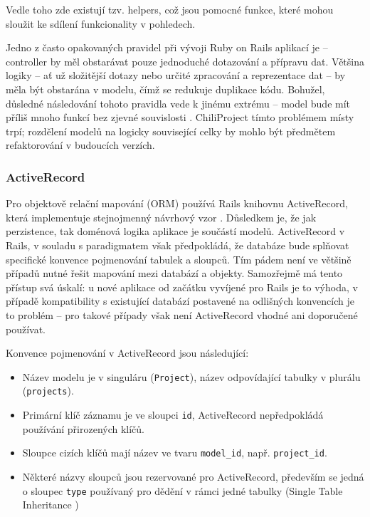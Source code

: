 \documentclass[thesis=B,czech]{FITthesis}[2012/05/02]
\begin{document}
Vedle toho zde existují tzv. helpers, což jsou pomocné funkce, které
mohou sloužit ke sdílení funkcionality v pohledech.

Jedno z často opakovaných pravidel při vývoji Ruby on Rails aplikací je
\citep{Buck2006} -- controller by měl
obstarávat pouze jednoduché dotazování a přípravu dat. Většina logiky --
ať už složitější dotazy nebo určité zpracování a reprezentace dat -- by
měla být obstarána v modelu, čímž se redukuje duplikace kódu. Bohužel,
důsledné následování tohoto pravidla vede k jinému extrému -- model bude mít
příliš mnoho funkcí bez zjevné souvislosti \citep{Libbery2011}.
ChiliProject tímto problémem místy trpí; rozdělení modelů na logicky
související celky \citep{Grimm2012} by mohlo být předmětem refaktorování
v budoucích verzích.

\subsubsection{ActiveRecord}

Pro objektově relační mapování (ORM) používá Rails knihovnu
ActiveRecord, která implementuje stejnojmenný návrhový vzor \citep[str.
160]{Fowler2003}. Důsledkem je, že jak perzistence, tak doménová logika
aplikace je součástí modelů. ActiveRecord v Rails, v souladu
s paradigmatem  však předpokládá, že
databáze bude splňovat specifické konvence pojmenování tabulek a
sloupců. Tím pádem není ve většině případů nutné řešit mapování mezi
databází a objekty. Samozřejmě má tento přístup svá úskalí: u nové
aplikace od začátku vyvíjené pro Rails je to výhoda, v případě
kompatibility s existující databází postavené na odlišných konvencích je
to problém -- pro takové případy však není ActiveRecord vhodné ani
doporučené používat.

Konvence pojmenování v ActiveRecord jsou následující:
\begin{itemize}
\item Název modelu je v singuláru (\lstinline!Project!), název odpovídající tabulky
v plurálu (\lstinline!projects!).
\item Primární klíč záznamu je ve sloupci \lstinline!id!, ActiveRecord nepředpokládá používání přirozených
klíčů.
\item Sloupce cizích klíčů mají název ve tvaru \lstinline!model_id!,
např. \lstinline!project_id!.
\item Některé názvy sloupců jsou rezervované pro ActiveRecord, především se jedná o sloupec \lstinline!type!
používaný pro dědění v rámci jedné tabulky (Single Table Inheritance
\citep[str. 278]{Fowler2003})
\end{itemize}
\end{document}
